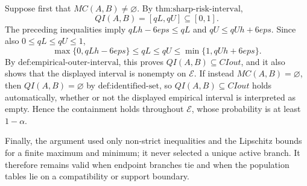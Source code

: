 Suppose first that \(MC(A,B)\ne\varnothing\).  By \(\text{thm:sharp-risk-interval}\),
\[
 QI(A,B)=[qL,qU]\subseteq[0,1].
\]
The preceding inequalities imply \(qLh-6eps\le qL\) and \(qU\le qUh+6eps\).  Since also \(0\le qL\le qU\le1\),
\[
 \max\{0,qLh-6eps\}
 \le qL
 \le qU
 \le \min\{1,qUh+6eps\}.
\]
By \(\text{def:empirical-outer-interval}\), this proves \(QI(A,B)\subseteq CIout\), and it also shows that the displayed interval is nonempty on \(\mathcal E\).  If instead \(MC(A,B)=\varnothing\), then \(QI(A,B)=\varnothing\) by \(\text{def:identified-set}\), so \(QI(A,B)\subseteq CIout\) holds automatically, whether or not the displayed empirical interval is interpreted as empty.  Hence the containment holds throughout \(\mathcal E\), whose probability is at least \(1-\alpha\).

Finally, the argument used only non-strict inequalities and the Lipschitz bounds for a finite maximum and minimum; it never selected a unique active branch.  It therefore remains valid when endpoint branches tie and when the population tables lie on a compatibility or support boundary.
